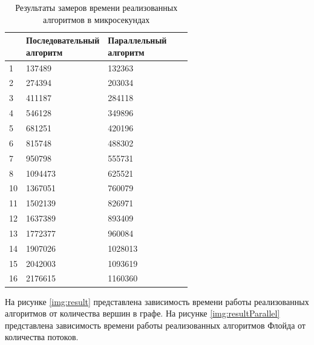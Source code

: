 \begin{table}[H]
	\begin{center}
		\begin{flushleft}
			\caption{\label{tab:timeParallel}Результаты замеров времени реализованных алгоритмов в микросекундах}
		\end{flushleft}
		\begin{tabular}{|l|l|l|l|l|}
			\hline \specialcell{Количество потоков} & \specialcell{Последовательный\\алгоритм} &
			\specialcell{Параллельный\\алгоритм}  \\\hline
			1  & 137489  & 132363 \\ \hline
			2  & 274394  & 203034 \\ \hline
			3  & 411187  & 284118 \\ \hline
			4  & 546128  & 349896 \\ \hline
			5  & 681251  & 420196 \\ \hline
			6  & 815748  & 488302 \\ \hline
			7  & 950798  & 555731 \\ \hline
			8  & 1094473 &  625521 \\ \hline
			10 & 1367051 & 760079 \\ \hline
			11 & 1502139 & 826971 \\ \hline
			12 & 1637389 & 893409 \\ \hline
			13 & 1772377 & 960084 \\ \hline
			14 & 1907026 & 1028013 \\ \hline
			15 & 2042003 & 1093619  \\ \hline
			16 & 2176615 & 1160360  \\ \hline
		\end{tabular}
	\end{center}
\end{table}

На рисунке \ref{img:result} представлена зависимость времени работы реализованных алгоритмов от количества вершин в графе. На рисунке \ref{img:resultParallel} представлена зависимость времени работы реализованных алгоритмов Флойда от количества потоков.

